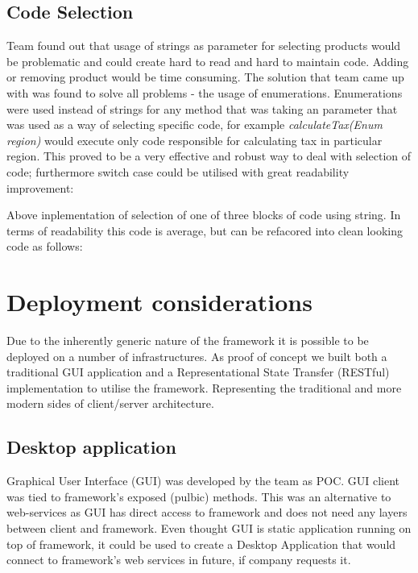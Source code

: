 \documentclass[pdftex,11pt,a4paper]{article}
\begin{document}
\subsection{Code Selection}
Team found out that usage of strings as parameter for selecting products would be problematic and could create hard to read and hard to maintain code. Adding or removing product would be time consuming. The solution that team came up with was found to solve all problems - the usage of enumerations. Enumerations were used instead of strings for any method that was taking an parameter that was used as a way of selecting specific code, for example \emph{calculateTax(Enum region)} would execute only code responsible for calculating tax in particular region. This proved to be a very effective and robust way to deal with selection of code; furthermore switch case could be utilised with great readability improvement:



Above inplementation of selection of one of three blocks of code using string. In terms of readability this code is average, but can be refacored into clean looking code as follows:



\pagebreak

\section{Deployment considerations}
Due to the inherently generic nature of the framework it is possible to be deployed on a number of infrastructures. As proof of concept we built both a traditional GUI application and a Representational State Transfer (RESTful)\cite{REST} implementation to utilise the framework. Representing the traditional and more modern sides of client/server architecture.

\subsection{Desktop application}

Graphical User Interface (GUI) was developed by the team as POC. GUI client was tied to framework's exposed (pulbic) methods. This was an alternative to web-services as GUI has direct access to framework and does not need any layers between client and framework. Even thought GUI is static application running on top of framework, it could be used to create a Desktop Application that would connect to framework's web services in future, if company requests it.
\end{document}
